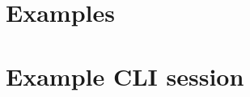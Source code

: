 \documentclass[11pt, a4paper,draft]{article}
\theoremstyle{plain}
\theoremstyle{definition}
\theoremstyle{remark}
\begin{document}
\section{Examples}
\section{Example CLI session}
\label{sec:example-cli}

\end{document}
